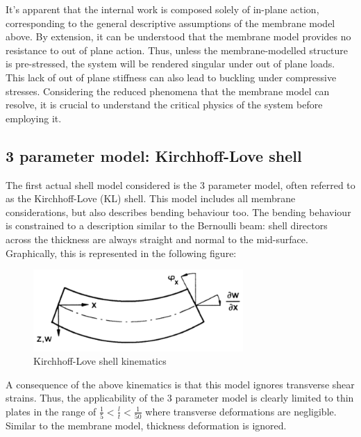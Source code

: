 
It's apparent that the internal work is composed solely of in-plane action, corresponding to the general descriptive assumptions of the membrane model above. By extension, it can be understood that the membrane model provides no resistance to out of plane action. Thus, unless the membrane-modelled structure is pre-stressed, the system will be rendered singular under out of plane loads. This lack of out of plane stiffness can also lead to buckling under compressive stresses. Considering the reduced phenomena that the membrane model can resolve, it is crucial to understand the critical physics of the system before employing it.

\subsection{3 parameter model: Kirchhoff-Love shell}

The first actual shell model considered is the 3 parameter model, often referred to as the Kirchhoff-Love (KL) shell. This model includes all membrane considerations, but also describes bending behaviour too. The bending behaviour is constrained to a description similar to the Bernoulli beam: shell directors across the thickness are always straight and normal to the mid-surface. Graphically, this is represented in the following figure:

\begin{figure}[H]
	\centering
	\def\svgwidth{\columnwidth}
	\includegraphics[width=8cm]{images/bernoullie.png}
	\caption{Kirchhoff-Love shell kinematics \cite{Bletz16}}
	\label{thinshellkine1}
\end{figure}

A consequence of the above kinematics is that this model ignores transverse shear strains. Thus, the applicability of the 3 parameter model is clearly limited to thin plates in the range of $\frac{1}{5} < \frac{l}{t} < \frac{1}{50}$ where transverse deformations are negligible. Similar to the membrane model, thickness deformation is ignored.


